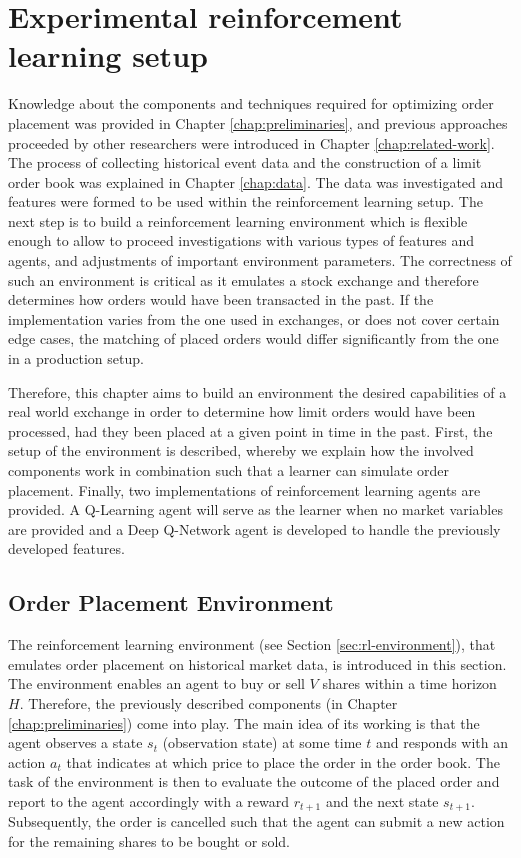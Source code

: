 \chapter{Experimental reinforcement learning setup}
\label{chap:setup}

Knowledge about the components and techniques required for optimizing order placement was provided in Chapter \ref{chap:preliminaries}, and previous approaches proceeded by other researchers were introduced in Chapter \ref{chap:related-work}.
The process of collecting historical event data and the construction of a limit order book was explained in Chapter \ref{chap:data}.
The data was investigated and features were formed to be used within the reinforcement learning setup.
The next step is to build a reinforcement learning environment which is flexible enough to allow to proceed investigations with various types of features and agents, and adjustments of important environment parameters.
The correctness of such an environment is critical as it emulates a stock exchange and therefore determines how orders would have been transacted in the past.
If the implementation varies from the one used in exchanges, or does not cover certain edge cases, the matching of placed orders would differ significantly from the one in a production setup.

Therefore, this chapter aims to build an environment the desired capabilities of a real world exchange in order to determine how limit orders would have been processed, had they been placed at a given point in time in the past.
First, the setup of the environment is described, whereby we explain how the involved components work in combination such that a learner can simulate order placement.
Finally, two implementations of reinforcement learning agents are provided.
A Q-Learning agent will serve as the learner when no market variables are provided and a Deep Q-Network agent is developed to handle the previously developed features.

\section{Order Placement Environment}
\label{sec:setup-order-placement}

The reinforcement learning environment (see Section \ref{sec:rl-environment}), that emulates order placement on historical market data, is introduced in this section.
The environment enables an agent to buy or sell $V$ shares within a time horizon $H$.
Therefore, the previously described components (in Chapter \ref{chap:preliminaries}) come into play.
The main idea of its working is that the agent observes a state $s_t$ (observation state) at some time $t$ and responds with an action $a_t$ that indicates at which price to place the order in the order book.
The task of the environment is then to evaluate the outcome of the placed order and report to the agent accordingly with a reward $r_{t+1}$ and the next state $s_{t+1}$.
Subsequently, the order is cancelled such that the agent can submit a new action for the remaining shares to be bought or sold.

